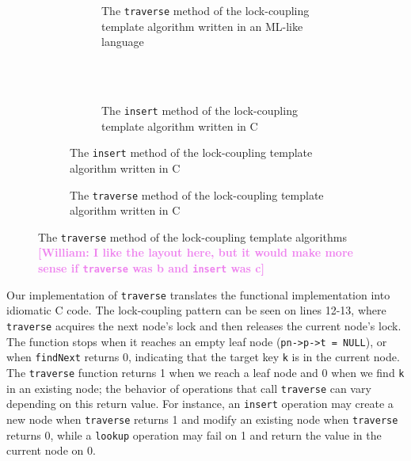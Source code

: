 \documentclass[a4paper,UKenglish,cleveref, autoref, thm-restate]{lipics-v2021}
\newcommand{\wm}[1]{\textbf{\textcolor{violet}{[William: #1]}}}
\begin{document}
\begin{figure}[h]
	\begin{subfigure}[t]{0.48\textwidth}
		\begin{subfigure}[t]{\textwidth}
			 
			\caption{The \lstinline{traverse} method of the lock-coupling template algorithm written in an ML-like language \cite{krishna2019compositional}} 
			\label{traverse_lock_a}	
		\end{subfigure}
		\\ \\ 
		\begin{subfigure}[t]{\textwidth}
			 
			\caption{The \lstinline{insert} method of the lock-coupling template algorithm written in C}
			\label{insert_lock}	
		\end{subfigure}
	\end{subfigure}\qquad
	\begin{subfigure}[t]{0.48\textwidth}
		 
		\caption{The \lstinline{traverse} method of the lock-coupling template algorithm written in C}
		\label{traverse_lock_b}
	\end{subfigure}
	\caption{The \lstinline{traverse} method of the lock-coupling template algorithms \wm{I like the layout here, but it would make more sense if \lstinline{traverse} was b and \lstinline{insert} was c}}
	\label{traverse_lock}
\end{figure}

Our implementation of \lstinline{traverse} translates the functional implementation into idiomatic C code. The lock-coupling pattern can be seen on lines 12-13, where \lstinline{traverse} acquires the next node's lock and then releases the current node's lock. The function stops when it reaches an empty leaf node (\lstinline{pn->p->t = NULL}), or when \lstinline{findNext} returns 0, indicating that the target key \lstinline{k} is in the current node. The \lstinline{traverse} function returns 1 when we reach a leaf node and 0 when we find \lstinline{k} in an existing node; the behavior of operations that call \lstinline{traverse} can vary depending on this return value. For instance, an \lstinline{insert} operation may create a new node when \lstinline{traverse} returns 1 and modify an existing node when \lstinline{traverse} returns 0, while a \lstinline{lookup} operation may fail on 1 and return the value in the current node on 0.
\end{document}
